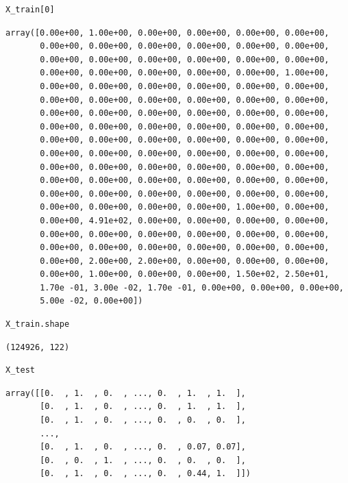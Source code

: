 \begin{verbatim}
X_train[0]
\end{verbatim}

\begin{verbatim}
array([0.00e+00, 1.00e+00, 0.00e+00, 0.00e+00, 0.00e+00, 0.00e+00,
       0.00e+00, 0.00e+00, 0.00e+00, 0.00e+00, 0.00e+00, 0.00e+00,
       0.00e+00, 0.00e+00, 0.00e+00, 0.00e+00, 0.00e+00, 0.00e+00,
       0.00e+00, 0.00e+00, 0.00e+00, 0.00e+00, 0.00e+00, 1.00e+00,
       0.00e+00, 0.00e+00, 0.00e+00, 0.00e+00, 0.00e+00, 0.00e+00,
       0.00e+00, 0.00e+00, 0.00e+00, 0.00e+00, 0.00e+00, 0.00e+00,
       0.00e+00, 0.00e+00, 0.00e+00, 0.00e+00, 0.00e+00, 0.00e+00,
       0.00e+00, 0.00e+00, 0.00e+00, 0.00e+00, 0.00e+00, 0.00e+00,
       0.00e+00, 0.00e+00, 0.00e+00, 0.00e+00, 0.00e+00, 0.00e+00,
       0.00e+00, 0.00e+00, 0.00e+00, 0.00e+00, 0.00e+00, 0.00e+00,
       0.00e+00, 0.00e+00, 0.00e+00, 0.00e+00, 0.00e+00, 0.00e+00,
       0.00e+00, 0.00e+00, 0.00e+00, 0.00e+00, 0.00e+00, 0.00e+00,
       0.00e+00, 0.00e+00, 0.00e+00, 0.00e+00, 0.00e+00, 0.00e+00,
       0.00e+00, 0.00e+00, 0.00e+00, 0.00e+00, 1.00e+00, 0.00e+00,
       0.00e+00, 4.91e+02, 0.00e+00, 0.00e+00, 0.00e+00, 0.00e+00,
       0.00e+00, 0.00e+00, 0.00e+00, 0.00e+00, 0.00e+00, 0.00e+00,
       0.00e+00, 0.00e+00, 0.00e+00, 0.00e+00, 0.00e+00, 0.00e+00,
       0.00e+00, 2.00e+00, 2.00e+00, 0.00e+00, 0.00e+00, 0.00e+00,
       0.00e+00, 1.00e+00, 0.00e+00, 0.00e+00, 1.50e+02, 2.50e+01,
       1.70e -01, 3.00e -02, 1.70e -01, 0.00e+00, 0.00e+00, 0.00e+00,
       5.00e -02, 0.00e+00])
\end{verbatim}

\begin{verbatim}
X_train.shape
\end{verbatim}

\begin{verbatim}
(124926, 122)
\end{verbatim}

\begin{verbatim}
X_test
\end{verbatim}

\begin{verbatim}
array([[0.  , 1.  , 0.  , ..., 0.  , 1.  , 1.  ],
       [0.  , 1.  , 0.  , ..., 0.  , 1.  , 1.  ],
       [0.  , 1.  , 0.  , ..., 0.  , 0.  , 0.  ],
       ...,
       [0.  , 1.  , 0.  , ..., 0.  , 0.07, 0.07],
       [0.  , 0.  , 1.  , ..., 0.  , 0.  , 0.  ],
       [0.  , 1.  , 0.  , ..., 0.  , 0.44, 1.  ]])
\end{verbatim}


